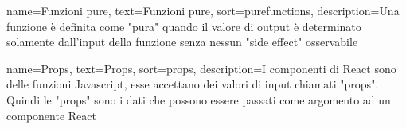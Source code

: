 {
	name=Funzioni pure,
	text=Funzioni pure,
	sort=purefunctions,
	description={Una funzione è definita come "pura" quando il valore di output è determinato solamente dall'input della funzione senza nessun "side effect" osservabile}
}

{
	name=Props,
	text=Props,
	sort=props,
	description={I componenti di React sono delle funzioni Javascript, esse accettano dei valori di input chiamati "props". Quindi le "props" sono i dati che possono essere passati come argomento ad un componente React}
}



